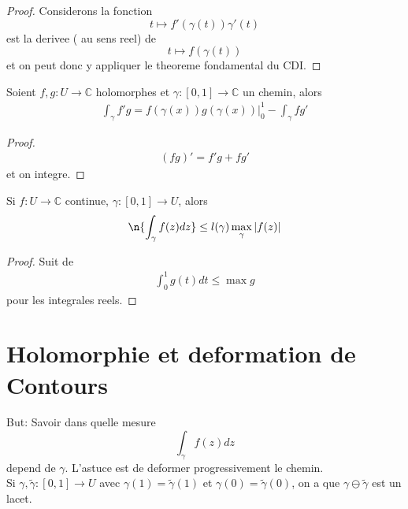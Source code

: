 \documentclass[../main.tex]{subfiles}
\begin{document}
\begin{proof}
Considerons la fonction
\[ 
	t \mapsto f'( \gamma( t) ) \gamma'( t) 
\]
est la derivee ( au sens reel) de
\[ 
	t \mapsto f( \gamma( t) ) 
\]
et on peut donc y appliquer le theoreme fondamental du CDI.
\end{proof}
\begin{propo}
Soient $f,g: U \to \mathbb{C}$ holomorphes et $\gamma: [ 0,1] \to \mathbb{C}$ un chemin, alors
\begin{align*}
	\int_{ \gamma }^{  }f' g = f( \gamma( x) )g( \gamma( x) ) \big\vert_{0} ^{1} - \int_{ \gamma }^{  }fg'
\end{align*}

\end{propo}
\begin{proof}
\begin{align*}
	( fg) '= f'g + fg'
\end{align*}
et on integre.
\end{proof}
\begin{propo}
Si $f: U \to \mathbb{C}$ continue, $\gamma: [ 0,1] \to U$, alors
\[ 
	\n { \int_{\gamma }^{  } f( z) dz} \leq l( \gamma) \max_\gamma |f( z)|
\]

\end{propo}
\begin{proof}
Suit de
\begin{align*}
	\int_{ 0 }^{ 1 }g( t) dt \leq  \max g
\end{align*}
pour les integrales reels.
\end{proof}
\section{Holomorphie et deformation de Contours}
But: Savoir dans quelle mesure 
\[ 
	\int_{\gamma} f( z) dz
\]
depend de $\gamma$. L'astuce est de deformer progressivement le chemin.\\
Si $\gamma,\tilde\gamma: [ 0,1] \to U$ avec $\gamma( 1) = \tilde\gamma( 1) $ et $\gamma( 0) =\tilde\gamma ( 0) $, on a que $\gamma\ominus \tilde\gamma$ est un lacet.
\end{document}

